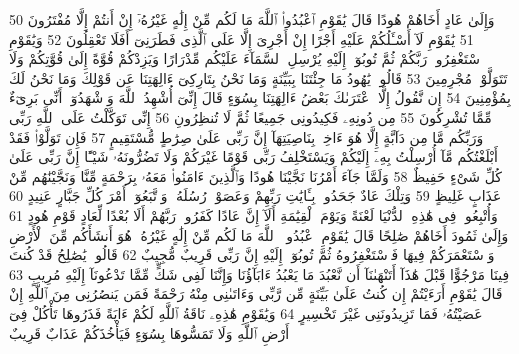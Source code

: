{\tiny\colorbox{cl_aya}{50}} وَإِلَىٰ عَادٍ أَخَاهُمْ هُودًا قَالَ يَٰقَوْمِ ٱعْبُدُوا۟ ٱللَّهَ مَا لَكُم مِّنْ إِلَٰهٍ غَيْرُهُۥٓ إِنْ أَنتُمْ إِلَّا مُفْتَرُونَ
{\tiny\colorbox{cl_aya}{51}} يَٰقَوْمِ لَآ أَسْـَٔلُكُمْ عَلَيْهِ أَجْرًا إِنْ أَجْرِىَ إِلَّا عَلَى ٱلَّذِى فَطَرَنِىٓ أَفَلَا تَعْقِلُونَ
{\tiny\colorbox{cl_aya}{52}} وَيَٰقَوْمِ ٱسْتَغْفِرُوا۟ رَبَّكُمْ ثُمَّ تُوبُوٓا۟ إِلَيْهِ يُرْسِلِ ٱلسَّمَآءَ عَلَيْكُم مِّدْرَارًا وَيَزِدْكُمْ قُوَّةً إِلَىٰ قُوَّتِكُمْ وَلَا تَتَوَلَّوْا۟ مُجْرِمِينَ
{\tiny\colorbox{cl_aya}{53}} قَالُوا۟ يَٰهُودُ مَا جِئْتَنَا بِبَيِّنَةٍ وَمَا نَحْنُ بِتَارِكِىٓ ءَالِهَتِنَا عَن قَوْلِكَ وَمَا نَحْنُ لَكَ بِمُؤْمِنِينَ
{\tiny\colorbox{cl_aya}{54}} إِن نَّقُولُ إِلَّا ٱعْتَرَىٰكَ بَعْضُ ءَالِهَتِنَا بِسُوٓءٍ قَالَ إِنِّىٓ أُشْهِدُ ٱللَّهَ وَٱشْهَدُوٓا۟ أَنِّى بَرِىٓءٌ مِّمَّا تُشْرِكُونَ
{\tiny\colorbox{cl_aya}{55}} مِن دُونِهِۦ فَكِيدُونِى جَمِيعًا ثُمَّ لَا تُنظِرُونِ
{\tiny\colorbox{cl_aya}{56}} إِنِّى تَوَكَّلْتُ عَلَى ٱللَّهِ رَبِّى وَرَبِّكُم مَّا مِن دَآبَّةٍ إِلَّا هُوَ ءَاخِذٌۢ بِنَاصِيَتِهَآ إِنَّ رَبِّى عَلَىٰ صِرَٰطٍ مُّسْتَقِيمٍ
{\tiny\colorbox{cl_aya}{57}} فَإِن تَوَلَّوْا۟ فَقَدْ أَبْلَغْتُكُم مَّآ أُرْسِلْتُ بِهِۦٓ إِلَيْكُمْ وَيَسْتَخْلِفُ رَبِّى قَوْمًا غَيْرَكُمْ وَلَا تَضُرُّونَهُۥ شَيْـًٔا إِنَّ رَبِّى عَلَىٰ كُلِّ شَىْءٍ حَفِيظٌ
{\tiny\colorbox{cl_aya}{58}} وَلَمَّا جَآءَ أَمْرُنَا نَجَّيْنَا هُودًا وَٱلَّذِينَ ءَامَنُوا۟ مَعَهُۥ بِرَحْمَةٍ مِّنَّا وَنَجَّيْنَٰهُم مِّنْ عَذَابٍ غَلِيظٍ
{\tiny\colorbox{cl_aya}{59}} وَتِلْكَ عَادٌ جَحَدُوا۟ بِـَٔايَٰتِ رَبِّهِمْ وَعَصَوْا۟ رُسُلَهُۥ وَٱتَّبَعُوٓا۟ أَمْرَ كُلِّ جَبَّارٍ عَنِيدٍ
{\tiny\colorbox{cl_aya}{60}} وَأُتْبِعُوا۟ فِى هَٰذِهِ ٱلدُّنْيَا لَعْنَةً وَيَوْمَ ٱلْقِيَٰمَةِ أَلَآ إِنَّ عَادًا كَفَرُوا۟ رَبَّهُمْ أَلَا بُعْدًا لِّعَادٍ قَوْمِ هُودٍ
{\tiny\colorbox{cl_aya}{61}} وَإِلَىٰ ثَمُودَ أَخَاهُمْ صَٰلِحًا قَالَ يَٰقَوْمِ ٱعْبُدُوا۟ ٱللَّهَ مَا لَكُم مِّنْ إِلَٰهٍ غَيْرُهُۥ هُوَ أَنشَأَكُم مِّنَ ٱلْأَرْضِ وَٱسْتَعْمَرَكُمْ فِيهَا فَٱسْتَغْفِرُوهُ ثُمَّ تُوبُوٓا۟ إِلَيْهِ إِنَّ رَبِّى قَرِيبٌ مُّجِيبٌ
{\tiny\colorbox{cl_aya}{62}} قَالُوا۟ يَٰصَٰلِحُ قَدْ كُنتَ فِينَا مَرْجُوًّا قَبْلَ هَٰذَآ أَتَنْهَىٰنَآ أَن نَّعْبُدَ مَا يَعْبُدُ ءَابَآؤُنَا وَإِنَّنَا لَفِى شَكٍّ مِّمَّا تَدْعُونَآ إِلَيْهِ مُرِيبٍ
{\tiny\colorbox{cl_aya}{63}} قَالَ يَٰقَوْمِ أَرَءَيْتُمْ إِن كُنتُ عَلَىٰ بَيِّنَةٍ مِّن رَّبِّى وَءَاتَىٰنِى مِنْهُ رَحْمَةً فَمَن يَنصُرُنِى مِنَ ٱللَّهِ إِنْ عَصَيْتُهُۥ فَمَا تَزِيدُونَنِى غَيْرَ تَخْسِيرٍ
{\tiny\colorbox{cl_aya}{64}} وَيَٰقَوْمِ هَٰذِهِۦ نَاقَةُ ٱللَّهِ لَكُمْ ءَايَةً فَذَرُوهَا تَأْكُلْ فِىٓ أَرْضِ ٱللَّهِ وَلَا تَمَسُّوهَا بِسُوٓءٍ فَيَأْخُذَكُمْ عَذَابٌ قَرِيبٌ
